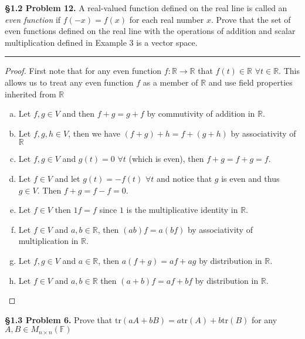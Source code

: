 \documentclass[leqno]{article}
\theoremstyle{nonumberplain}
\newtheorem{proof}{Proof}
\newcommand{\tr}{\mathrm{tr}}
\begin{document}
\noindent\textbf{\S 1.2 Problem 12.} A real-valued function defined on the real line is called an \emph{even function} if $f(-x)=f(x)$ for each real number $x$. Prove that the set of even functions defined on the real line with the operations of addition and scalar multiplication defined in Example $3$ is a vector space.

\noindent\rule[0.5ex]{\linewidth}{1pt}

\begin{proof} First note that for any even function $f\colon \mathbb{R} \to \mathbb{R}$ that $f(t)\in \mathbb{R}$ $\forall t \in \mathbb{R}$.  This allows us to treat any even function $f$ as a member of $\mathbb{R}$ and use field properties inherited from $\mathbb{R}$\\
\begin{enumerate}[(a)]
\item Let $f,g\in V$ and then $f+g=g+f$ by commutivity of addition in $\mathbb{R}$.
\item Let $f,g,h \in V$, then we have $(f+g)+h=f+(g+h)$ by associativity of $\mathbb{R}$
\item Let $f,g \in V$ and $g(t)=0$ $\forall t$ (which is even), then $f+g=f+g=f$.
\item Let $f \in V$ and let $g(t)=-f(t)$ $\forall t$ and notice that $g$ is even and thus $g \in V$.  Then $f+g=f-f=0$.
\item Let $f \in V$ then $1f=f$ since $1$ is the multiplicative identity in $\mathbb{R}$.
\item Let $f \in V$ and $a,b\in \mathbb{R}$, then $(ab)f=a(bf)$ by associativity of multiplication in $\mathbb{R}$.
\item Let $f,g \in V$ and $a \in \mathbb{R}$, then $a(f+g)=af+ag$ by distribution in $\mathbb{R}$.
\item Let $f \in V$ and $a,b \in \mathbb{R}$ then $(a+b)f=af+bf$ by distribution in $\mathbb{R}$.
\end{enumerate}
\end{proof}

\pagebreak




\noindent\textbf{\S 1.3 Problem 6.} Prove that $\tr(aA+bB)=a\tr(A)+b\tr(B)$ for any $A,B\in M_{n\times n}(\mathbb{F})$
\end{document}
